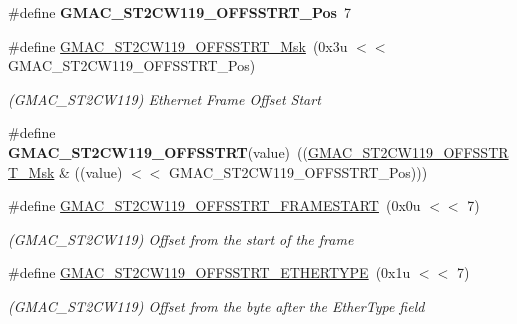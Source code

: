 \begin{DoxyCompactItemize}
\item 
\mbox{\label{group__SAMV71__GMAC_ga18ffa26520619e39aa339b9588abae56}} 
\#define {\bfseries G\+M\+A\+C\+\_\+\+S\+T2\+C\+W119\+\_\+\+O\+F\+F\+S\+S\+T\+R\+T\+\_\+\+Pos}~7
\item 
\mbox{\label{group__SAMV71__GMAC_gac02934bd49150d33b2d4d4352d00d83a}} 
\#define \mbox{\hyperlink{group__SAMV71__GMAC_gac02934bd49150d33b2d4d4352d00d83a}{G\+M\+A\+C\+\_\+\+S\+T2\+C\+W119\+\_\+\+O\+F\+F\+S\+S\+T\+R\+T\+\_\+\+Msk}}~(0x3u $<$$<$ G\+M\+A\+C\+\_\+\+S\+T2\+C\+W119\+\_\+\+O\+F\+F\+S\+S\+T\+R\+T\+\_\+\+Pos)
\begin{DoxyCompactList}\small\item\em (G\+M\+A\+C\+\_\+\+S\+T2\+C\+W119) Ethernet Frame Offset Start \end{DoxyCompactList}\item 
\mbox{\label{group__SAMV71__GMAC_ga25a679e7f65e5db5b659158af1ae5acf}} 
\#define {\bfseries G\+M\+A\+C\+\_\+\+S\+T2\+C\+W119\+\_\+\+O\+F\+F\+S\+S\+T\+RT}(value)~((\mbox{\hyperlink{group__SAMV71__GMAC_gac02934bd49150d33b2d4d4352d00d83a}{G\+M\+A\+C\+\_\+\+S\+T2\+C\+W119\+\_\+\+O\+F\+F\+S\+S\+T\+R\+T\+\_\+\+Msk}} \& ((value) $<$$<$ G\+M\+A\+C\+\_\+\+S\+T2\+C\+W119\+\_\+\+O\+F\+F\+S\+S\+T\+R\+T\+\_\+\+Pos)))
\item 
\mbox{\label{group__SAMV71__GMAC_gab255cd22ec26511db33419713e5a8abe}} 
\#define \mbox{\hyperlink{group__SAMV71__GMAC_gab255cd22ec26511db33419713e5a8abe}{G\+M\+A\+C\+\_\+\+S\+T2\+C\+W119\+\_\+\+O\+F\+F\+S\+S\+T\+R\+T\+\_\+\+F\+R\+A\+M\+E\+S\+T\+A\+RT}}~(0x0u $<$$<$ 7)
\begin{DoxyCompactList}\small\item\em (G\+M\+A\+C\+\_\+\+S\+T2\+C\+W119) Offset from the start of the frame \end{DoxyCompactList}\item 
\mbox{\label{group__SAMV71__GMAC_ga39d82a1d786ba0328ff736367b518490}} 
\#define \mbox{\hyperlink{group__SAMV71__GMAC_ga39d82a1d786ba0328ff736367b518490}{G\+M\+A\+C\+\_\+\+S\+T2\+C\+W119\+\_\+\+O\+F\+F\+S\+S\+T\+R\+T\+\_\+\+E\+T\+H\+E\+R\+T\+Y\+PE}}~(0x1u $<$$<$ 7)
\begin{DoxyCompactList}\small\item\em (G\+M\+A\+C\+\_\+\+S\+T2\+C\+W119) Offset from the byte after the Ether\+Type field \end{DoxyCompactList}\item 

\end{DoxyCompactItemize}
